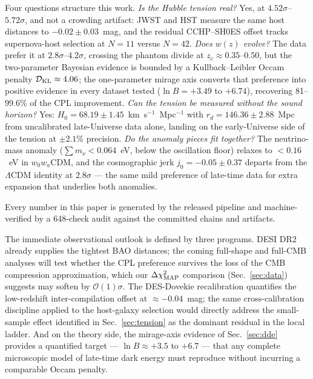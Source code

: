 \documentclass[aps,prd,preprint,superscriptaddress,nofootinbib]{revtex4-2}
\begin{document}
Four questions structure this work. \emph{Is the Hubble tension real?} Yes, at $4.52\sigma$--$5.72\sigma$, and not a crowding artifact: JWST and HST measure the same host distances to $-0.02 \pm 0.03$~mag, and the residual CCHP--SH0ES offset tracks supernova-host selection at $N = 11$ versus $N = 42$. \emph{Does $w(z)$ evolve?} The data prefer it at $2.8\sigma$--$4.2\sigma$, crossing the phantom divide at $z_c \approx 0.35$--$0.50$, but the two-parameter Bayesian evidence is bounded by a Kullback--Leibler Occam penalty $\mathcal{D}_{\rm KL} \approx 4.06$; the one-parameter mirage axis converts that preference into positive evidence in every dataset tested ($\ln B = +3.49$ to $+6.74$), recovering 81--99.6\% of the CPL improvement. \emph{Can the tension be measured without the sound horizon?} Yes: $H_0 = 68.19 \pm 1.45$~km~s$^{-1}$~Mpc$^{-1}$ with $r_d = 146.36 \pm 2.88$~Mpc from uncalibrated late-Universe data alone, landing on the early-Universe side of the tension at $\pm 2.1\%$ precision. \emph{Do the anomaly pieces fit together?} The neutrino-mass anomaly ($\sum m_\nu < 0.064$~eV, below the oscillation floor) relaxes to $< 0.16$~eV in $w_0w_a$CDM, and the cosmographic jerk $j_0 = -0.05 \pm 0.37$ departs from the $\Lambda$CDM identity at $2.8\sigma$ --- the same mild preference of late-time data for extra expansion that underlies both anomalies.

Every number in this paper is generated by the released pipeline and machine-verified by a 648-check audit against the committed chains and artifacts.

The immediate observational outlook is defined by three programs. DESI DR2 already supplies the tightest BAO distances; the coming full-shape and full-CMB analyses will test whether the CPL preference survives the loss of the CMB compression approximation, which our $\Delta\chi^2_{\rm MAP}$ comparison (Sec.~\ref{sec:data}) suggests may soften by $\mathcal{O}(1)\sigma$. The DES-Dovekie recalibration quantifies the low-redshift inter-compilation offset at $\approx -0.04$~mag; the same cross-calibration discipline applied to the host-galaxy selection would directly address the small-sample effect identified in Sec.~\ref{sec:tension} as the dominant residual in the local ladder. And on the theory side, the mirage-axis evidence of Sec.~\ref{sec:dde} provides a quantified target --- $\ln B \approx +3.5$ to $+6.7$ --- that any complete microscopic model of late-time dark energy must reproduce without incurring a comparable Occam penalty.
\end{document}
